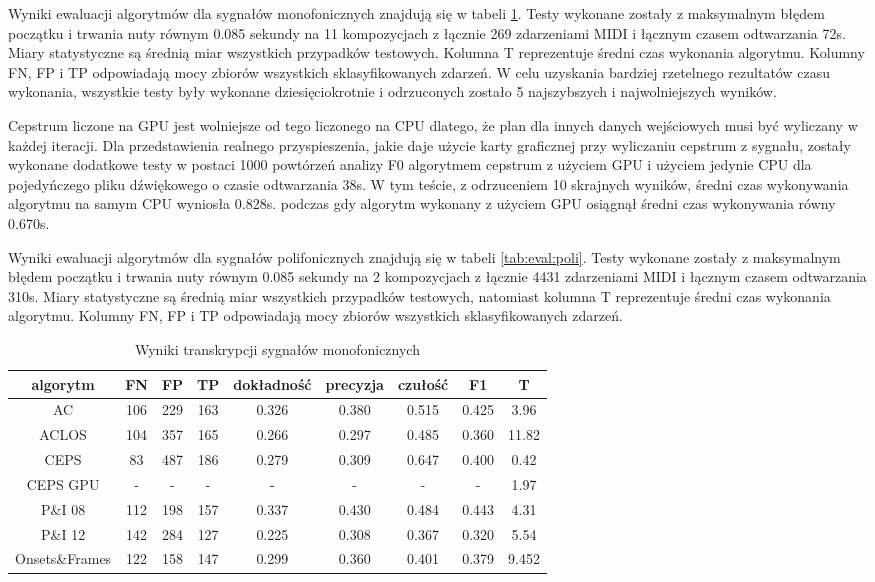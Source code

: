 \documentclass[12pt,a4paper,twoside]{mwart}
\begin{document}
Wyniki ewaluacji algorytmów dla sygnałów monofonicznych znajdują się w tabeli \ref{tab:eval:mono}. Testy wykonane zostały z maksymalnym błędem początku i trwania nuty równym 0.085 sekundy na 11 kompozycjach z łącznie 269 zdarzeniami MIDI i łącznym czasem odtwarzania 72s. Miary statystyczne są średnią miar wszystkich przypadków testowych. Kolumna T reprezentuje średni czas wykonania algorytmu. Kolumny FN, FP i TP odpowiadają mocy zbiorów wszystkich sklasyfikowanych zdarzeń. W celu uzyskania bardziej rzetelnego rezultatów czasu wykonania, wszystkie testy były wykonane dziesięciokrotnie i odrzuconych zostało 5 najszybszych i najwolniejszych wyników.

Cepstrum liczone na GPU jest wolniejsze od tego liczonego na CPU dlatego, że plan dla innych danych wejściowych musi być wyliczany w każdej iteracji. Dla przedstawienia realnego przyspieszenia, jakie daje użycie karty graficznej przy wyliczaniu cepstrum z sygnału, zostały wykonane dodatkowe testy w postaci 1000 powtórzeń analizy F0 algorytmem cepstrum z użyciem GPU i użyciem jedynie CPU dla pojedyńczego pliku dźwiękowego o czasie odtwarzania 38s. W tym teście, z odrzuceniem 10 skrajnych wyników, średni czas wykonywania algorytmu na samym CPU wyniosła  0.828s. podczas gdy algorytm wykonany z użyciem GPU osiągnął średni czas wykonywania równy 0.670s.

Wyniki ewaluacji algorytmów dla sygnałów polifonicznych znajdują się w tabeli \ref{tab:eval:poli}. Testy wykonane zostały z maksymalnym błędem początku i trwania nuty równym 0.085 sekundy na 2 kompozycjach z łącznie 4431 zdarzeniami MIDI i łącznym czasem odtwarzania 310s. Miary statystyczne są średnią miar wszystkich przypadków testowych, natomiast kolumna T reprezentuje średni czas wykonania algorytmu. Kolumny FN, FP i TP odpowiadają mocy zbiorów wszystkich sklasyfikowanych zdarzeń.

\begin{table}[H]
  \begin{center}
    \begin{tabular}{ |c|c|c|c|c|c|c|c|c| } 
    \hline
    algorytm & FN & FP & TP & dokładność & precyzja & czułość & F1 & T\\
    \hline
    AC & 106 & 229 & 163 & 0.326 & 0.380 & 0.515 & 0.425 & 3.96 \\
    ACLOS & 104 & 357 & 165 & 0.266 & 0.297 & 0.485 & 0.360 & 11.82\\
    CEPS & 83 & 487 & 186 & 0.279 & 0.309 & 0.647 & 0.400 & 0.42\\
    CEPS GPU & - & - & - & - & - & - & - & 1.97\\
    P\&I 08  & 112 & 198 & 157 & 0.337 & 0.430 & 0.484 & 0.443 & 4.31\\
    P\&I 12 & 142 & 284 & 127 & 0.225 & 0.308 & 0.367 & 0.320 & 5.54\\
    Onsets\&Frames & 122 & 158 & 147 & 0.299 & 0.360 & 0.401 & 0.379 & 9.452\\
    \hline
    \end{tabular}
  \end{center}
  \caption{Wyniki transkrypcji sygnałów monofonicznych}
  \label{tab:eval:mono}
\end{table}
\end{document}
